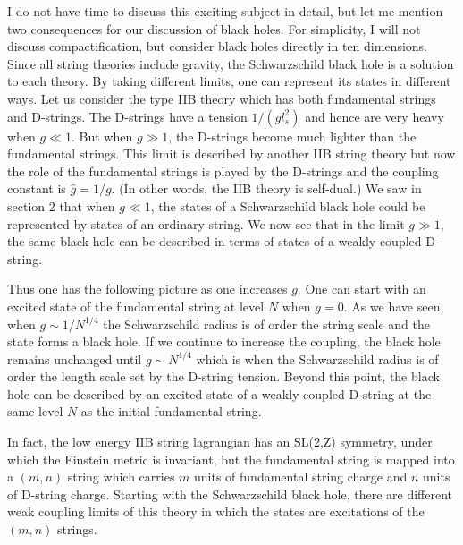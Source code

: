I do not have time to discuss this exciting subject in detail,
but let me mention two consequences for our discussion of black holes.
For simplicity, I will not discuss compactification, but consider
black holes directly in ten dimensions.
Since all string theories include gravity, the Schwarzschild black hole
is a solution to each theory.  By taking different limits, one can
represent its states in different ways.
Let us consider the type IIB theory 
which has both fundamental strings and
D-strings. The D-strings have a tension $1/(g l_s^2)$ and hence are very heavy 
when $g \ll 1$. But when $g\gg 1$, the D-strings become  much lighter
than the fundamental strings. This limit is described by another
IIB string theory but now the role of the fundamental strings is played by
the D-strings and the coupling constant is $\hat g = 1/g$. (In other words,
the IIB theory is self-dual.) We saw in section 2 that when $g \ll 1$,
the states of a Schwarzschild black hole could be represented by states
of an ordinary string. We now see that
in the limit $g \gg 1$,  the same black hole can be described in terms of
states of a weakly coupled D-string. 

Thus one has the following picture as one increases $g$.
One can start with an excited state of the fundamental string at level $N$
when $g=0$.
As we have seen, when $g\sim 1/N^{1/4}$
the Schwarzschild radius is of order the string scale and
the state forms a black hole. If we continue to increase the coupling,
the black hole remains unchanged  until
$g \sim N^{1/4}$ which is when the Schwarzschild radius is of order the
length scale set by the D-string tension. Beyond this point,
the black hole can be described by an excited state of 
a weakly coupled D-string at the same level $N$ as the initial fundamental
string. 

In fact, the low energy IIB string lagrangian
has an SL(2,Z) symmetry, under which the Einstein metric is invariant,
but the fundamental string is mapped into a $(m,n)$ string which carries
$m$ units of fundamental string charge and $n$ units of D-string charge.
Starting with the Schwarzschild black hole, there are different weak
coupling limits of this theory in which the states are excitations of the
$(m,n)$ strings.

